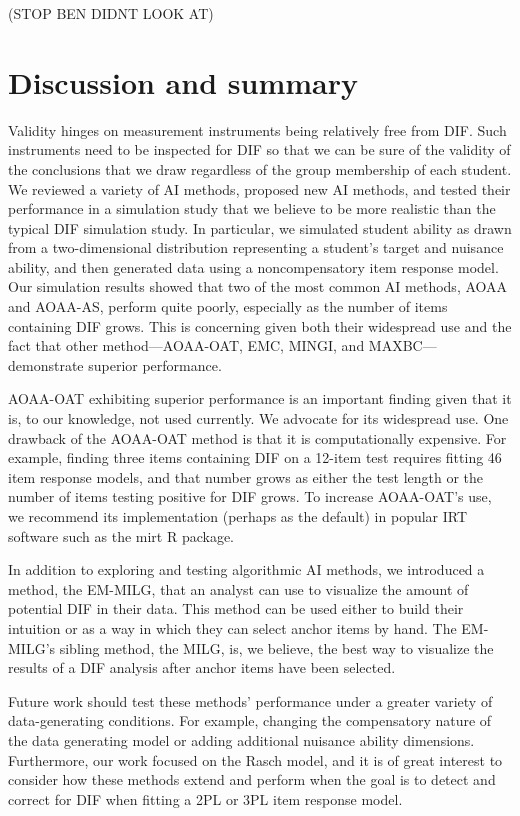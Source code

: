 \documentclass[
  11pt,
]{article}
\begin{document}
(STOP BEN DIDNT LOOK AT)

\hypertarget{discussion-and-summary}{%
\section{Discussion and summary}\label{discussion-and-summary}}

Validity hinges on measurement instruments being relatively free from DIF. Such instruments need to be inspected for DIF so that we can be sure of the validity of the conclusions that we draw regardless of the group membership of each student. We reviewed a variety of AI methods, proposed new AI methods, and tested their performance in a simulation study that we believe to be more realistic than the typical DIF simulation study. In particular, we simulated student ability as drawn from a two-dimensional distribution representing a student's target and nuisance ability, and then generated data using a noncompensatory item response model. Our simulation results showed that two of the most common AI methods, AOAA and AOAA-AS, perform quite poorly, especially as the number of items containing DIF grows. This is concerning given both their widespread use and the fact that other method---AOAA-OAT, EMC, MINGI, and MAXBC---demonstrate superior performance.

AOAA-OAT exhibiting superior performance is an important finding given that it is, to our knowledge, not used currently. We advocate for its widespread use. One drawback of the AOAA-OAT method is that it is computationally expensive. For example, finding three items containing DIF on a 12-item test requires fitting 46 item response models, and that number grows as either the test length or the number of items testing positive for DIF grows. To increase AOAA-OAT's use, we recommend its implementation (perhaps as the default) in popular IRT software such as the mirt R package.

In addition to exploring and testing algorithmic AI methods, we introduced a method, the EM-MILG, that an analyst can use to visualize the amount of potential DIF in their data. This method can be used either to build their intuition or as a way in which they can select anchor items by hand. The EM-MILG's sibling method, the MILG, is, we believe, the best way to visualize the results of a DIF analysis after anchor items have been selected.

Future work should test these methods' performance under a greater variety of data-generating conditions. For example, changing the compensatory nature of the data generating model or adding additional nuisance ability dimensions. Furthermore, our work focused on the Rasch model, and it is of great interest to consider how these methods extend and perform when the goal is to detect and correct for DIF when fitting a 2PL or 3PL item response model.
\end{document}
